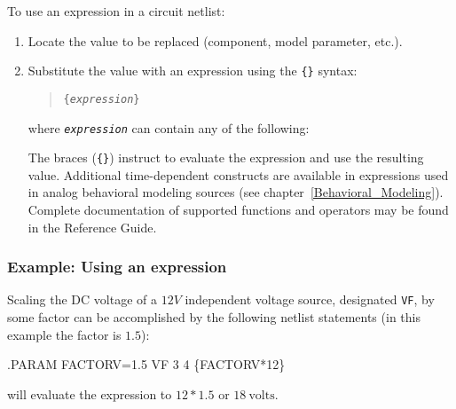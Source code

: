 To use an expression in a circuit netlist:
\begin{enumerate}
\item Locate the value to be replaced (component, model parameter, etc.).
\item Substitute the value with an expression using the \texttt{\{\}}
  syntax:
\begin{quote}
  \texttt{\{{\it expression\/}\}}%
\end{quote}
where \texttt{\it expression\/} can contain any of the
following:
The braces (\texttt{\{\}}) instruct \Xyce{} to evaluate the expression and use
the resulting value. Additional time-dependent constructs are available in expressions used in analog behavioral modeling sources (see chapter~\ref{Behavioral_Modeling}).    Complete documentation of supported functions and operators may be found in the \Xyce{} Reference Guide\ReferenceGuide{}.


\end{enumerate}

\subsubsection{Example:  Using an expression}
Scaling the DC voltage of a $12V$ independent voltage source, designated
\verb+VF+, by some factor can be accomplished by the following netlist
statements (in this example the factor is $1.5$):
\begin{vquote}
.PARAM FACTORV=1.5
VF 3 4 \{FACTORV*12\}
\end{vquote}
\Xyce{} will evaluate the expression to $12 * 1.5$ or $18\:\mbox{volts}$.




